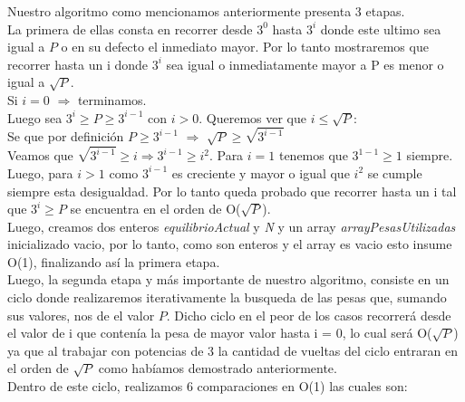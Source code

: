 
Nuestro algoritmo como mencionamos anteriormente presenta 3 etapas.\\
La primera de ellas consta en recorrer desde $3^0$ hasta $3^i$ donde este ultimo sea igual a $P$ o en su defecto el inmediato mayor. Por lo tanto mostraremos que recorrer hasta un i donde $3^i$ sea igual o inmediatamente mayor a P es menor o igual a $\sqrt{P}$.\\


Si $i = 0$ $\Rightarrow$ terminamos.\\
Luego sea $3^i \geq P \geq 3^{i-1}$ con $i > 0$. Queremos ver que $i \leq \sqrt{P}$:\\
Se que por definici\'on $P \geq 3^{i-1}$ $\Rightarrow$ $\sqrt{P} \geq \sqrt{3^{i-1}}$\\
Veamos que $\sqrt{3^{i-1}} \geq i \Rightarrow 3^{i-1} \geq {i^2}$. Para $i = 1$ tenemos que $3^{1-1} \geq 1$ siempre. Luego, para $i > 1$ como ${3^{i-1}}$ es creciente y mayor o igual que $i^2$ se cumple siempre esta desigualdad. Por lo tanto queda probado que recorrer hasta un i tal que $3^i \geq P$ se encuentra en el orden de  O($\sqrt{P}$).\\


 Luego, creamos dos enteros \textit{equilibrioActual} y \textit{N} y un array \textit{arrayPesasUtilizadas} inicializado vacio, por lo tanto, como son enteros y el array es vacio esto insume O(1), finalizando as\'i la primera etapa.\\
Luego, la segunda etapa y m\'as importante de nuestro algoritmo, consiste en un ciclo donde realizaremos iterativamente la busqueda de las pesas que, sumando sus valores, nos de el valor $P$. Dicho ciclo en el peor de los casos recorrer\'a desde el valor de i que conten\'ia la pesa de mayor valor hasta i = 0, lo cual ser\'a O($\sqrt{P}$) ya que al trabajar con potencias de 3 la cantidad de vueltas del ciclo entraran en el orden de $\sqrt{P}$ como hab\'iamos demostrado anteriormente.\\ 

Dentro de este ciclo, realizamos 6 comparaciones en O(1) las cuales son:

